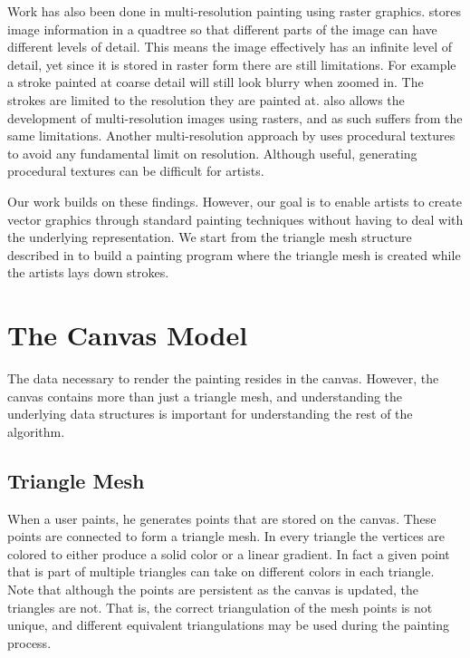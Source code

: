 \documentclass[review]{acmsiggraph}
\begin{document}
Work has also been done in multi-resolution painting using raster graphics. \cite{Berman:1994:MPC:192161.192181}
stores image information in a quadtree so that different parts of the image can have different levels of detail.
This means the image effectively has an infinite level of detail, yet since it is stored in raster form
there are still limitations. For example a stroke painted at coarse detail will still look blurry when
zoomed in. The strokes are limited to the resolution they are painted at. \cite{Carr:2004:PD:1186562.1015809}
also allows the development of multi-resolution images using rasters, and as such suffers from the
same limitations. Another multi-resolution approach by \cite{Perlin:1995:LPP:218380.218437} uses
procedural textures to avoid any fundamental limit on resolution. Although useful,
generating procedural textures can be difficult for artists.

Our work builds on these findings. However, our goal is to enable artists to create vector
graphics through standard painting techniques without having to deal with the underlying representation.
We start from the triangle mesh structure described in \cite{10.1109/TVCG.2012.76} to build a painting program
where the triangle mesh is created while the artists lays down strokes. 

\section{The Canvas Model}
The data necessary to render the painting resides in the canvas. However, the canvas contains more than just
a triangle mesh, and understanding the underlying data structures is important for 
understanding the rest of the algorithm.

\subsection{Triangle Mesh}
When a user paints, he generates points that are stored on the canvas. These points are
connected to form a triangle mesh. In every triangle the vertices are colored to either
produce a solid color or a linear gradient. In fact a given point that is part of
multiple triangles can take on different colors in each triangle. Note that although
the points are persistent as the canvas is updated, the triangles are not.  That is, the correct triangulation of the mesh points is not unique, and different equivalent triangulations may be used during the painting process.
\end{document}
